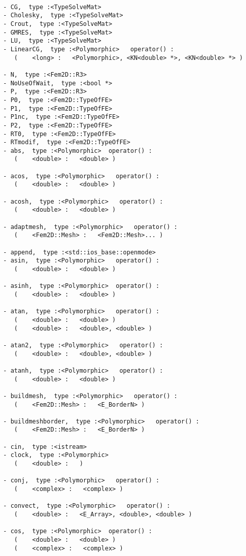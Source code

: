 \documentclass[twoside]{book}
\begin{document}
\begin{verbatim}

  - CG,  type :<TypeSolveMat>
  - Cholesky,  type :<TypeSolveMat>
  - Crout,  type :<TypeSolveMat>
  - GMRES,  type :<TypeSolveMat>
  - LU,  type :<TypeSolveMat>
  - LinearCG,  type :<Polymorphic>   operator() : 
	 (	  <long> :   <Polymorphic>, <KN<double> *>, <KN<double> *> )

  - N,  type :<Fem2D::R3>
  - NoUseOfWait,  type :<bool *>
  - P,  type :<Fem2D::R3>
  - P0,  type :<Fem2D::TypeOfFE>
  - P1,  type :<Fem2D::TypeOfFE>
  - P1nc,  type :<Fem2D::TypeOfFE>
  - P2,  type :<Fem2D::TypeOfFE>
  - RT0,  type :<Fem2D::TypeOfFE>
  - RTmodif,  type :<Fem2D::TypeOfFE>
  - abs,  type :<Polymorphic>  operator() : 
	 (	  <double> :   <double> )

  - acos,  type :<Polymorphic>   operator() : 
	 (	  <double> :   <double> )

  - acosh,  type :<Polymorphic>   operator() : 
	 (	  <double> :   <double> )

  - adaptmesh,  type :<Polymorphic>   operator() : 
	 (	  <Fem2D::Mesh> :   <Fem2D::Mesh>... )

  - append,  type :<std::ios_base::openmode>
  - asin,  type :<Polymorphic>   operator() : 
	 (	  <double> :   <double> )

  - asinh,  type :<Polymorphic>  operator() : 
	 (	  <double> :   <double> )

  - atan,  type :<Polymorphic>   operator() : 
	 (	  <double> :   <double> )
	 (	  <double> :   <double>, <double> )

  - atan2,  type :<Polymorphic>   operator() : 
	 (	  <double> :   <double>, <double> )

  - atanh,  type :<Polymorphic>   operator() : 
	 (	  <double> :   <double> )

  - buildmesh,  type :<Polymorphic>   operator() : 
	 (	  <Fem2D::Mesh> :   <E_BorderN> )

  - buildmeshborder,  type :<Polymorphic>   operator() : 
	 (	  <Fem2D::Mesh> :   <E_BorderN> )

  - cin,  type :<istream>
  - clock,  type :<Polymorphic>   
	 (	  <double> :   )

  - conj,  type :<Polymorphic>   operator() : 
	 (	  <complex> :   <complex> )

  - convect,  type :<Polymorphic>   operator() : 
	 (	  <double> :   <E_Array>, <double>, <double> )

  - cos,  type :<Polymorphic>  operator() : 
	 (	  <double> :   <double> )
	 (	  <complex> :   <complex> )


\end{verbatim}
\end{document}
